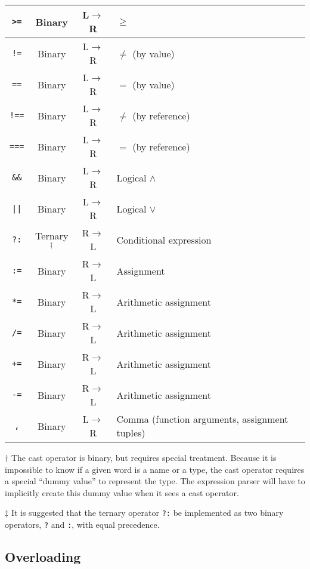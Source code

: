 \documentclass{article}
\begin{document}
\begin{center}
\begin{threeparttable}
\begin{tabular}{|c|c|c|l|}
      \texttt{>=} & Binary & L$\to$R & $\geq$ \\ \hline
      \texttt{!=} & Binary & L$\to$R & $\not=$ (by value) \\
      \texttt{==} & Binary & L$\to$R & $=$ (by value) \\
      \texttt{!==} & Binary & L$\to$R & $\not=$ (by reference) \\
      \texttt{===} & Binary & L$\to$R & $=$ (by reference) \\ \hline
      \texttt{\&\&} & Binary & L$\to$R & Logical $\land$ \\ \hline
      \texttt{||} & Binary & L$\to$R & Logical $\lor$ \\ \hline
      \texttt{?:} & Ternary$^\ddag$ & R$\to$L & Conditional expression \\ \hline
      \texttt{:=} & Binary & R$\to$L & Assignment \\
      \texttt{*=} & Binary & R$\to$L & Arithmetic assignment \\
      \texttt{/=} & Binary & R$\to$L & Arithmetic assignment \\
      \texttt{+=} & Binary & R$\to$L & Arithmetic assignment \\
      \texttt{-=} & Binary & R$\to$L & Arithmetic assignment \\ \hline
      \texttt{,} & Binary & L$\to$R & Comma (function arguments, assignment tuples) \\ \hline
    \end{tabular}
    \begin{tablenotes}
      \item{$\dagger$ \small{The cast operator is binary, but requires special treatment.
          Because it is impossible to know if a given word is a name or a type, the
          cast operator requires a special ``dummy value'' to represent the type. The
          expression parser will have to implicitly create this dummy value when it sees
          a cast operator.}}
      \item{$\ddag$ \small{It is suggested that the ternary operator \texttt{?:}
          be implemented as two binary operators, \texttt{?} and \texttt{:},
          with equal precedence.}}
    \end{tablenotes}
  \end{threeparttable}
\end{center}

\subsection{Overloading}
\label{sub:operators:overloading}
\end{document}
